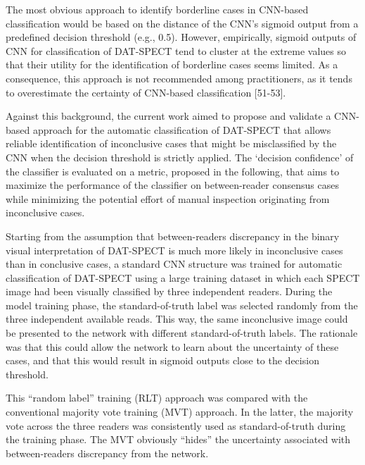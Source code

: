 
The most obvious approach to identify borderline cases in CNN-based classification would be based on the distance of the CNN's sigmoid output from a predefined decision threshold (e.g., 0.5). 
However, empirically, sigmoid outputs of CNN for classification of DAT-SPECT tend to cluster at the extreme values so that their utility for the identification of borderline cases seems limited.  
As a consequence, this approach is not recommended among practitioners, as it tends to overestimate the certainty of CNN-based classification [51-53].


Against this background, the current work aimed to propose and validate a CNN-based approach for the automatic classification of DAT-SPECT 
that allows reliable identification of inconclusive cases that might be misclassified by the CNN when the decision threshold is strictly applied.
The `decision confidence' of the classifier is evaluated on a metric, proposed in the following, that aims to maximize the performance of the classifier
on between-reader consensus cases while minimizing the potential effort of manual inspection originating from inconclusive cases.

Starting from the assumption that between-readers discrepancy in the binary visual interpretation of DAT-SPECT is much more likely in inconclusive cases 
than in conclusive cases, a standard CNN structure was trained for automatic classification of DAT-SPECT using a large training dataset in which each 
SPECT image had been visually classified by three independent readers. 
During the model training phase, the standard-of-truth label was selected randomly from the three independent available reads. 
This way, the same inconclusive image could be presented to the network with different standard-of-truth labels. 
The rationale was that this could allow the network to learn about the uncertainty of these cases, 
and that this would result in sigmoid outputs close to the decision threshold.

This “random label” training (RLT) approach was compared with the conventional majority vote training (MVT) approach. 
In the latter,  the majority vote across the three readers was consistently used as standard-of-truth during the training phase. 
The MVT obviously “hides” the uncertainty associated with between-readers discrepancy from the network. 

